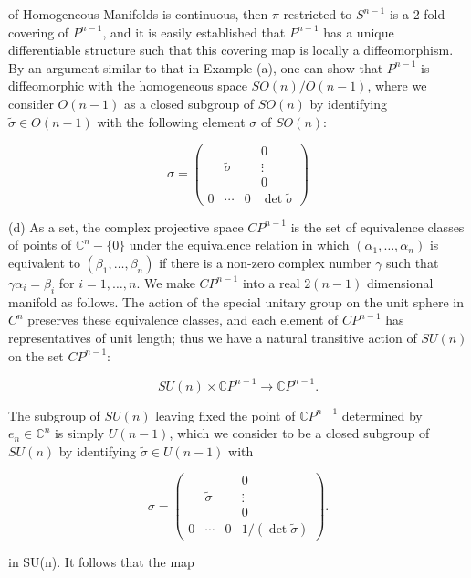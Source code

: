 \begin{examples}{of Homogeneous Manifolds}
is continuous, then $\pi$ restricted to $S^{n-1}$ is a 2-fold covering of $P^{n-1}$, and it is easily established that $P^{n-1}$ has a unique differentiable structure such that this covering map is locally a diffeomorphism. By an argument similar to that in Example (a), one can show that $P^{n-1}$ is diffeomorphic with the homogeneous space $SO(n)/O(n-1)$, where we consider $O(n-1)$ as a closed subgroup of $SO(n)$ by identifying $\tilde{\sigma}\in O(n-1)$ with the following element $\sigma$ of $SO(n)$:

\[
\sigma=\begin{pmatrix} & & & 0\\ & \tilde{\sigma} & & \vdots\\ & & & 0\\ 0 & \cdots & 0 & \det\tilde{\sigma}\end{pmatrix}
\]

(d) As a set, the complex projective space $CP^{n-1}$ is the set of equivalence classes of points of $\mathbb{C}^{n}-\{0\}$ under the equivalence relation in which $(\alpha_{1},\ldots,\alpha_{n})$ is equivalent to $(\beta_{1},\ldots,\beta_{n})$ if there is a non-zero complex number $\gamma$ such that $\gamma\alpha_{i}=\beta_{i}$ for $i=1,\ldots,n$. We make $CP^{n-1}$ into a real $2(n-1)$ dimensional manifold as follows. The action of the special unitary group on the unit sphere in $C^{n}$ preserves these equivalence classes, and each element of $CP^{n-1}$ has representatives of unit length; thus we have a natural transitive action of $SU(n)$ on the set $CP^{n-1}$: 

\begin{equation}
\tag{18}\label{eq:3.65:18}
SU(n)\times\mathbb{C}P^{n-1}\to\mathbb{C}P^{n-1}.
\end{equation}

The subgroup of $SU(n)$ leaving fixed the point of $\mathbb{C}P^{n-1}$ determined by $e_n \in \mathbb{C}^n$ is simply $U(n-1)$, which we consider to be a closed subgroup of $SU(n)$ by identifying $\tilde{\sigma} \in U(n-1)$ with

\[
\sigma=\begin{pmatrix} & & & 0\\ & \tilde{\sigma} & & \vdots\\ & & & 0\\ 0 & \cdots & 0 & 1/(\det\tilde{\sigma})\end{pmatrix}.
\]

in SU(n). It follows that the map


\end{examples}
